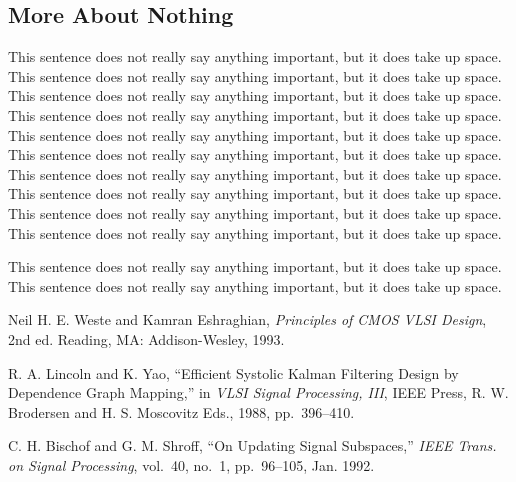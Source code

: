 \documentclass[conference]{IEEEconf}
\begin{document}
\subsection{More About Nothing}

This sentence does not really say anything important, but it does take up space.
This sentence does not really say anything important, but it does take up space.
This sentence does not really say anything important, but it does take up space.
This sentence does not really say anything important, but it does take up space.
This sentence does not really say anything important, but it does take up space.
This sentence does not really say anything important, but it does take up space.
This sentence does not really say anything important, but it does take up space.
This sentence does not really say anything important, but it does take up space.
This sentence does not really say anything important, but it does take up space.
This sentence does not really say anything important, but it does take up space.

This sentence does not really say anything important, but it does take up space.
This sentence does not really say anything important, but it does take up space.





\begin{thebibliography}{99}

   Neil H. E. Weste and Kamran Eshraghian, {\it Principles
  of CMOS VLSI Design}, 2nd ed. Reading, MA: Addison-Wesley, 1993.

   R. A. Lincoln and K. Yao, ``Efficient Systolic Kalman
  Filtering Design by Dependence Graph Mapping,'' in {\it VLSI Signal
  Processing, III}, IEEE Press, R. W. Brodersen and H. S. Moscovitz Eds.,
  1988, pp.~396--410.

   C. H. Bischof and G. M. Shroff, ``On Updating Signal
  Subspaces,'' {\it IEEE Trans. on Signal Processing}, vol.~40, no.~1,
  pp.~96--105, Jan. 1992.

\end{thebibliography}
\end{document}
